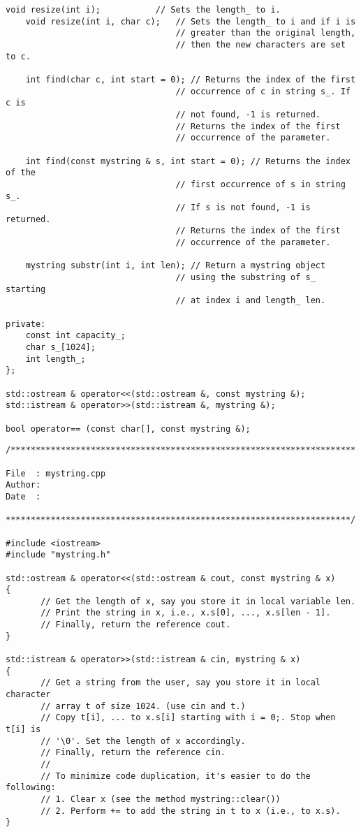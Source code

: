 {\begin{Verbatim}[frame=single]
    void resize(int i);           // Sets the length_ to i.
    void resize(int i, char c);   // Sets the length_ to i and if i is
                                  // greater than the original length,
                                  // then the new characters are set to c.

    int find(char c, int start = 0); // Returns the index of the first
                                  // occurrence of c in string s_. If c is
                                  // not found, -1 is returned.
                                  // Returns the index of the first
                                  // occurrence of the parameter.

    int find(const mystring & s, int start = 0); // Returns the index of the
                                  // first occurrence of s in string s_.
                                  // If s is not found, -1 is returned.
                                  // Returns the index of the first
                                  // occurrence of the parameter.

    mystring substr(int i, int len); // Return a mystring object
                                  // using the substring of s_ starting
                                  // at index i and length_ len.

private:
    const int capacity_;
    char s_[1024];
    int length_;
};

std::ostream & operator<<(std::ostream &, const mystring &);
std::istream & operator>>(std::istream &, mystring &);

bool operator== (const char[], const mystring &);
\end{Verbatim}
}

{\small
\begin{Verbatim}[frame=single]
/*********************************************************************

File  : mystring.cpp
Author:
Date  :

*********************************************************************/

#include <iostream>
#include "mystring.h"

std::ostream & operator<<(std::ostream & cout, const mystring & x)
{
       // Get the length of x, say you store it in local variable len.
       // Print the string in x, i.e., x.s[0], ..., x.s[len - 1].
       // Finally, return the reference cout.
}

std::istream & operator>>(std::istream & cin, mystring & x)
{
       // Get a string from the user, say you store it in local character
       // array t of size 1024. (use cin and t.)
       // Copy t[i], ... to x.s[i] starting with i = 0;. Stop when t[i] is 
       // '\0'. Set the length of x accordingly.
       // Finally, return the reference cin.
       //
       // To minimize code duplication, it's easier to do the following:
       // 1. Clear x (see the method mystring::clear())
       // 2. Perform += to add the string in t to x (i.e., to x.s).
}
\end{Verbatim}
}

